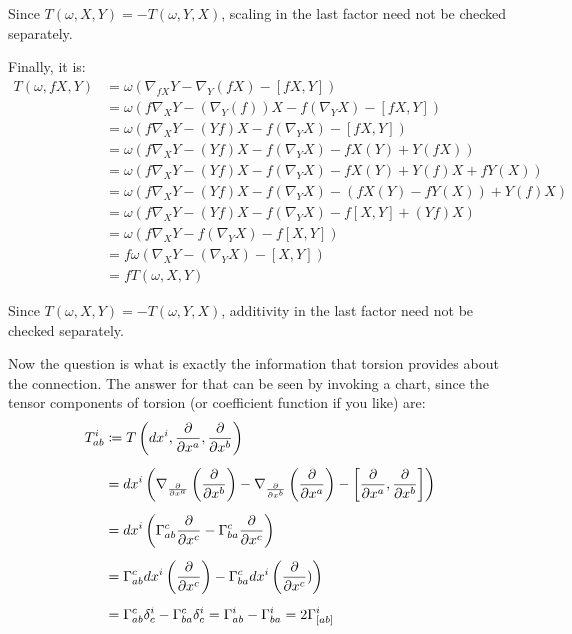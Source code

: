 Since $T(\omega,X,Y) = - T(\omega,Y,X)$, scaling in the last factor need not be checked separately.

\item Finally, it is:
\begin{align*}
T(\omega, fX, Y) & = \omega(\nabla_{fX} Y - \nabla_Y (fX) - [fX,Y]) \\
& = \omega(f\nabla_{X} Y - (\nabla_Y (f))X - f(\nabla_Y X) - [fX,Y]) \\
& = \omega(f\nabla_{X} Y - (Yf)X - f(\nabla_Y X) - [fX,Y]) \\
& = \omega(f\nabla_{X} Y - (Yf)X - f(\nabla_Y X) - fX(Y) + Y(fX)) \\
& = \omega(f\nabla_{X} Y - (Yf)X - f(\nabla_Y X) - fX(Y) + Y(f)X + fY (X))\\
& = \omega(f\nabla_{X} Y - (Yf)X - f(\nabla_Y X) - (fX(Y) - fY(X))+ Y (f)X )\\
& = \omega(f\nabla_{X} Y - (Yf)X - f(\nabla_Y X) - f[X,Y] + (Yf)X) \\
& = \omega(f\nabla_{X} Y - f(\nabla_Y X) - f[X,Y]) \\
& = f\omega(\nabla_{X} Y - (\nabla_Y X) - [X,Y]) \\
&= fT(\omega,X,Y)
\end{align*}

Since $T(\omega,X,Y) = - T(\omega,Y,X)$, additivity in the last factor need not be checked separately.
\eit

Now the question is what is exactly the information that torsion provides about the connection. The answer for that
can be seen by invoking a chart, since the tensor components of torsion (or coefficient function if you like) are:
\begin{align*}
T^{i}_{ab} & \coloneqq T\left(dx^i, \frac{\partial }{\partial x^a}, \frac{\partial }{\partial x^b}\right) \\[5pt]
&= dx^i \left(\nabla_{\frac{\partial }{\partial x^a}} \left(\frac{\partial }{\partial x^b}\right) - \nabla_{\frac{\partial }{\partial x^b}} \left( \frac{\partial }{\partial x^a}\right)
- \left[ \frac{\partial }{\partial x^a},\frac{\partial }{\partial x^b} \right] \right) \\[5pt]
&= dx^i \left( \Gamma^{c}_{ab} \frac{\partial }{\partial x^c} -\Gamma^{c}_{ba} \frac{\partial }{\partial x^c} \right)\\[5pt]
&= \Gamma^{c}_{ab} dx^i \left( \frac{\partial }{\partial x^c} \right) -\Gamma^{c}_{ba} dx^i \left(\frac{\partial }{\partial x^c})\right)\\[5pt]
&= \Gamma^{c}_{ab} \delta^{i}_{c} -\Gamma^{c}_{ba} \delta^{i}_{c} = \Gamma^{i}_{ab} - \Gamma^{i}_{ba} = 2 \Gamma^{i}_{[ab]}
\end{align*}

